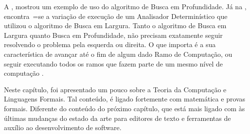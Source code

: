 {    A ,
    mostrou um exemplo de uso do algoritmo de Busca em Profundidade.
    Já na ,
    encontra~=se a variação de execução de um Analisador Determinístico que utilizou o algoritmo de Busca em Largura.
    Tanto o algoritmo de Busca em Largura quanto Busca em Profundidade,
    não precisam exatamente seguir resolvendo o problema pela esquerda ou
    direita.
    O que importa é a sua característica de avançar até o fim de algum dado Ramo de Computação,
    ou seguir executando todos os ramos que fazem parte de um mesmo nível de computação \cite{cormenIntroductionToAlgorithms,efficientBreadthFirstSearch}.
}

Neste capítulo,
foi apresentado um pouco sobre a Teoria da Computação e
Linguagens Formais.
Tal conteúdo,
é ligado fortemente com matemática e
provas formais.
Diferente do conteúdo do próximo capítulo,
que está mais ligado com às últimas mudanças do estado da arte para editores de texto e
ferramentas de auxílio ao desenvolvimento de software.
